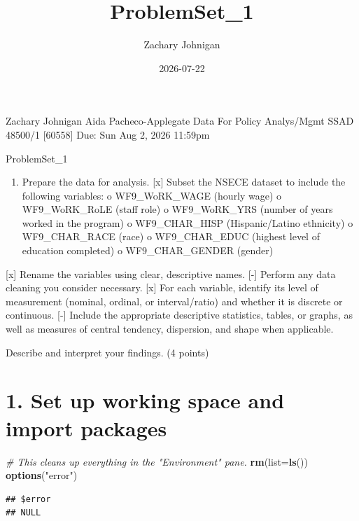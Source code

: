 \documentclass[
]{article}
\title{ProblemSet\_1}
\author{Zachary Johnigan}
\date{2026-07-22}
\newenvironment{Shaded}{\begin{snugshade}}{\end{snugshade}}
\newcommand{\AttributeTok}[1]{\textcolor[rgb]{0.13,0.29,0.53}{#1}}
\newcommand{\CommentTok}[1]{\textcolor[rgb]{0.56,0.35,0.01}{\textit{#1}}}
\newcommand{\FunctionTok}[1]{\textcolor[rgb]{0.13,0.29,0.53}{\textbf{#1}}}
\newcommand{\NormalTok}[1]{#1}
\newcommand{\StringTok}[1]{\textcolor[rgb]{0.31,0.60,0.02}{#1}}
\providecommand{\tightlist}{%
  \setlength{\itemsep}{0pt}\setlength{\parskip}{0pt}}
\begin{document}
\maketitle

Zachary Johnigan Aida Pacheco-Applegate Data For Policy Analys/Mgmt SSAD
48500/1 {[}60558{]} Due: Sun Aug 2, 2026 11:59pm

\centering

ProblemSet\_1

\begin{enumerate}
\def\labelenumi{\arabic{enumi}.}
\tightlist
\item
  Prepare the data for analysis. {[}x{]} Subset the NSECE dataset to
  include the following variables: o WF9\_WoRK\_WAGE (hourly wage) o
  WF9\_WoRK\_RoLE (staff role) o WF9\_WoRK\_YRS (number of years worked
  in the program) o WF9\_CHAR\_HISP (Hispanic/Latino ethnicity) o
  WF9\_CHAR\_RACE (race) o WF9\_CHAR\_EDUC (highest level of education
  completed) o WF9\_CHAR\_GENDER (gender)
\end{enumerate}

{[}x{]} Rename the variables using clear, descriptive names. {[}-{]}
Perform any data cleaning you consider necessary. {[}x{]} For each
variable, identify its level of measurement (nominal, ordinal, or
interval/ratio) and whether it is discrete or continuous. {[}-{]}
Include the appropriate descriptive statistics, tables, or graphs, as
well as measures of central tendency, dispersion, and shape when
applicable.

Describe and interpret your findings. (4 points)

\section{1. Set up working space and import
packages}\label{set-up-working-space-and-import-packages}

\begin{Shaded}
\begin{Highlighting}[]
\CommentTok{\# This cleans up everything in the "Environment" pane.}
\FunctionTok{rm}\NormalTok{(}\AttributeTok{list=}\FunctionTok{ls}\NormalTok{())}
\FunctionTok{options}\NormalTok{(}\StringTok{"error"}\NormalTok{)}
\end{Highlighting}
\end{Shaded}

\begin{verbatim}
## $error
## NULL
\end{verbatim}
\end{document}
